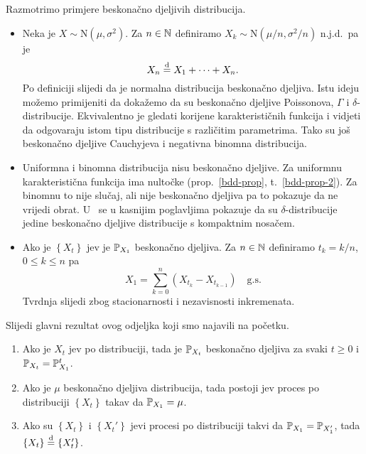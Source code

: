 \documentclass[main.tex]{subfiles}
\begin{document}
\begin{komentar} \label{bdd-komentar}
	Razmotrimo primjere beskonačno djeljivih distribucija.
	\begin{itemize}
		\item Neka je \( X \sim \mathrm N(\mu, \sigma^2) \). Za \( n \in \N \) definiramo \( X_k \sim \mathrm N(\mu/n, \sigma^2/n) \) n.j.d.\ pa je
		      \[
			      X_n \jpod X_1 + \cdots + X_n.
		      \]
		      Po definiciji slijedi da je normalna distribucija beskonačno djeljiva. Istu ideju možemo primijeniti da dokažemo da su beskonačno djeljive Poissonova,
		      \( \Gamma \) i \( \delta \)-distribucije. Ekvivalentno je gledati korijene karakterističnih funkcija i vidjeti da odgovaraju istom tipu distribucije
		      s različitim parametrima. Tako su još beskonačno djeljive Cauchyjeva i negativna binomna distribucija.

		\item Uniformna i binomna distribucija nisu beskonačno djeljive. Za uniformnu karakteristična funkcija ima nultočke (prop.~\ref{bdd-prop}, t.~\ref{bdd-prop-2}).
		      Za binomnu to nije slučaj, ali nije beskonačno djeljiva pa to pokazuje da ne vrijedi obrat. U~\cite{sato} se u kasnijim poglavljima pokazuje da su \( \delta \)-distribucije
		      jedine beskonačno djeljive distribucije s kompaktnim nosačem.

		\item Ako je \( \left\{ X_t \right\} \) \levy jev je \( \P_{X_1} \) beskonačno djeljiva. Za \( n \in \N \) definiramo \( t_k = k/n \), \( 0 \le k \le n \) pa
		      \[
			      X_1 = \sum_{k=0}^n \left( X_{t_k} - X_{t_{k-1}} \right) \quad \mathrm{g.s.}
		      \]
		      Tvrdnja slijedi zbog stacionarnosti i nezavisnosti inkremenata.
	\end{itemize}
\end{komentar}

Slijedi glavni rezultat ovog odjeljka koji smo najavili na početku.
\begin{teorem} \label{bddlpd}
	\begin{enumerate}[label=(\roman*)]
		\item Ako je \( {X_t} \) \levy jev po distribuciji, tada je \( \P_{X_t} \) beskonačno djeljiva za svaki \( t \geq 0 \) i \( \P_{X_t} = \P_{X_1}^t \). \label{bddlpd1}
		\item Ako je \( \mu \) beskonačno djeljiva distribucija, tada postoji \levy jev proces po distribuciji \( \left\{ X_t \right\} \) takav da \( \P_{X_1} = \mu \). \label{bddlpd2}
		\item Ako su \( \left\{ X_t \right\} \) i \( \left\{ X_t' \right\} \) \levy jevi procesi po distribuciji takvi da \( \P_{X_1} = \P_{X_1'} \), tada \( \left\{ X_t \right\} \jpod \left\{ X_t' \right\}\). \label{bddlpd3}
	\end{enumerate}
\end{teorem}
\end{document}
